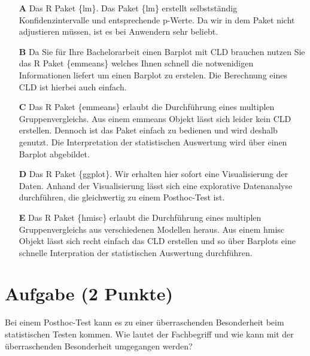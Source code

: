 \documentclass[a4paper, 9pt]{scrartcl}\usepackage[]{graphicx}\usepackage[]{xcolor}
\begin{document}
\begin{enumerate}
\item [\textbf{A} \msquare] Das R Paket \{lm\}. Das Paket \{lm\} erstellt selbstständig Konfidenzintervalle und entsprechende p-Werte. Da wir in dem Paket nicht adjustieren müssen, ist es bei Anwendern sehr beliebt.
\item [\textbf{B} \msquare] Da Sie für Ihre Bachelorarbeit einen Barplot mit CLD brauchen nutzen Sie das R Paket \{emmeans\} welches Ihnen schnell die notwenidigen Informationen liefert um einen Barplot zu erstelen. Die Berechnung eines CLD ist hierbei auch einfach.
\item [\textbf{C} \msquare] Das R Paket \{emmeans\} erlaubt die Durchführung eines multiplen Gruppenvergleichs. Aus einem emmeans Objekt lässt sich leider kein CLD erstellen. Dennoch ist das Paket einfach zu bedienen und wird deshalb genutzt. Die Interpretation der statistischen Auswertung wird über einen Barplot abgebildet.
\item [\textbf{D} \msquare] Das R Paket \{ggplot\}. Wir erhalten hier sofort eine Visualisierung der Daten. Anhand der Visualisierung lässt sich eine explorative Datenanalyse durchführen, die gleichwertig zu einem Posthoc-Test ist.
\item [\textbf{E} \msquare] Das R Paket \{hmisc\} erlaubt die Durchführung eines multiplen Gruppenvergleichs aus verschiedenen Modellen heraus. Aus einem hmisc Objekt lässt sich recht einfach das CLD erstellen und so über Barplots eine schnelle Interpration der statistischen Auswertung durchführen.
\end{enumerate}

\section{Aufgabe \hfill (2 Punkte)}



Bei einem Posthoc-Test kann es zu einer überraschenden Besonderheit beim statistischen Testen kommen. Wie lautet der Fachbegriff und wie kann mit der überraschenden Besonderheit umgegangen werden?
\end{document}

